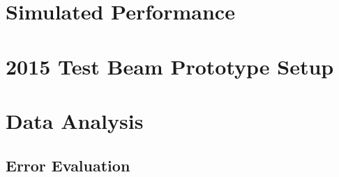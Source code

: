 \label{ch:analysis}

\section{Simulated Performance}

\section{2015 Test Beam Prototype Setup}

\section{Data Analysis}

\subsection{Error Evaluation}